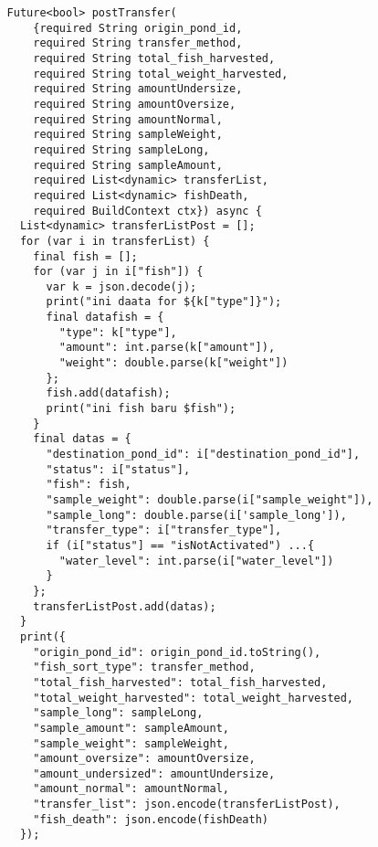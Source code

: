 \begin{lstlisting}
          Future<bool> postTransfer(
              {required String origin_pond_id,
              required String transfer_method,
              required String total_fish_harvested,
              required String total_weight_harvested,
              required String amountUndersize,
              required String amountOversize,
              required String amountNormal,
              required String sampleWeight,
              required String sampleLong,
              required String sampleAmount,
              required List<dynamic> transferList,
              required List<dynamic> fishDeath,
              required BuildContext ctx}) async {
            List<dynamic> transferListPost = [];
            for (var i in transferList) {
              final fish = [];
              for (var j in i["fish"]) {
                var k = json.decode(j);
                print("ini daata for ${k["type"]}");
                final datafish = {
                  "type": k["type"],
                  "amount": int.parse(k["amount"]),
                  "weight": double.parse(k["weight"])
                };
                fish.add(datafish);
                print("ini fish baru $fish");
              }
              final datas = {
                "destination_pond_id": i["destination_pond_id"],
                "status": i["status"],
                "fish": fish,
                "sample_weight": double.parse(i["sample_weight"]),
                "sample_long": double.parse(i['sample_long']),
                "transfer_type": i["transfer_type"],
                if (i["status"] == "isNotActivated") ...{
                  "water_level": int.parse(i["water_level"])
                }
              };
              transferListPost.add(datas);
            }
            print({
              "origin_pond_id": origin_pond_id.toString(),
              "fish_sort_type": transfer_method,
              "total_fish_harvested": total_fish_harvested,
              "total_weight_harvested": total_weight_harvested,
              "sample_long": sampleLong,
              "sample_amount": sampleAmount,
              "sample_weight": sampleWeight,
              "amount_oversize": amountOversize,
              "amount_undersized": amountUndersize,
              "amount_normal": amountNormal,
              "transfer_list": json.encode(transferListPost),
              "fish_death": json.encode(fishDeath)
            });
        

\end{lstlisting}
